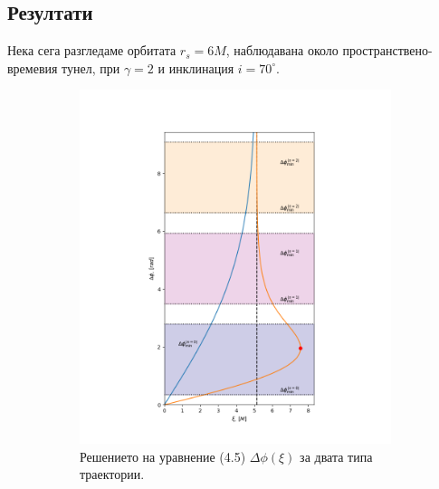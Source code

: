 \documentclass[12pt]{article}
\numberwithin{equation}{section}
\numberwithin{figure}{section}
\begin{document}
	\subsection{Резултати}
	
	Нека сега разгледаме орбитата $r_s = 6M$, наблюдавана около пространствено-времевия тунел, при $\gamma = 2$ и инклинация $i = 70^\circ$.
	\begin{figure}[h]
		\centering
		\begin{subfigure}{6cm}
			\centering
			\includegraphics[scale = 0.3]{Section_6_Morphology_of_the images_of_horizonless_spacetimes/WH_70_deg_r6_impact_gamma_2.png}
			\caption{Решението на уравнение (4.5) $\Delta\phi(\xi)$ за двата типа траектории.} \label{fig:1a}
		\end{subfigure}\,\,\,
		\begin{subfigure}{6cm}
			\centering

\end{subfigure}
\end{figure}
\end{document}
